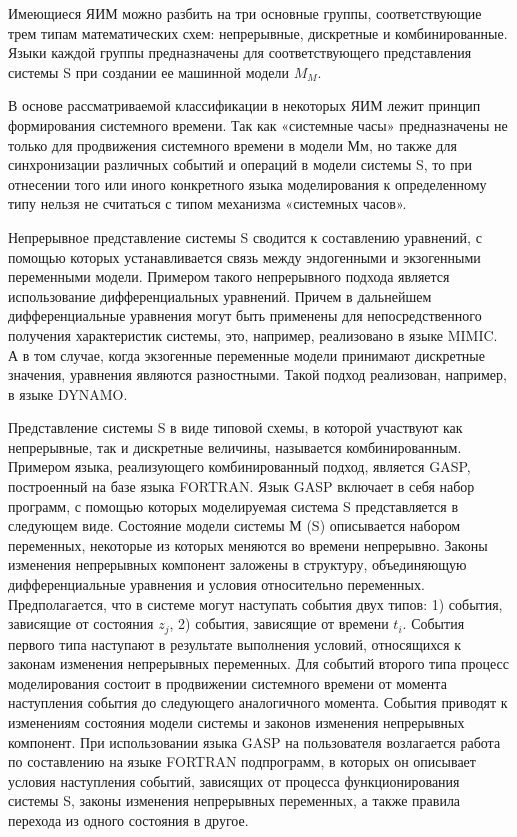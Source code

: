     Имеющиеся ЯИМ можно разбить на три основные группы, соответствующие трем типам математических схем: непрерывные, дискретные и комбинированные. Языки каждой группы предназначены для соответствующего представления системы S при создании ее машинной модели $M_{M}$.

    В основе рассматриваемой классификации в некоторых ЯИМ лежит принцип формирования системного времени. Так как «системные часы» предназначены не только для продвижения системного времени в модели Мм, но также для синхронизации различных событий и операций в модели системы S, то при отнесении того или иного конкретного языка моделирования к определенному типу нельзя не считаться с типом механизма «системных часов».

    Непрерывное представление системы S сводится к составлению уравнений, с помощью которых устанавливается связь между эндогенными и экзогенными переменными модели. Примером такого непрерывного подхода является использование дифференциальных уравнений. Причем в дальнейшем дифференциальные уравнения могут быть применены для непосредственного получения характеристик системы, это, например, реализовано в языке MIMIC. А в том случае, когда экзогенные переменные модели принимают дискретные значения, уравнения являются разностными. Такой подход реализован, например, в языке DYNAMO.

    Представление системы S в виде типовой схемы, в которой участвуют как непрерывные, так и дискретные величины, называется комбинированным. Примером языка, реализующего комбинированный подход, является GASP, построенный на базе языка FORTRAN. Язык GASP включает в себя набор программ, с помощью которых моделируемая система S представляется в следующем виде. Состояние модели системы М (S) описывается набором переменных, некоторые из которых меняются во времени непрерывно. Законы изменения непрерывных компонент заложены в структуру, объединяющую дифференциальные уравнения и условия относительно переменных. Предполагается, что в системе могут наступать события двух типов: 1) события, зависящие от состояния $z_{j}$, 2) события, зависящие от времени $t_{i}$. События первого типа наступают в результате выполнения условий, относящихся к законам изменения непрерывных переменных. Для событий второго типа процесс моделирования состоит в продвижении системного времени от момента наступления события до следующего аналогичного момента. События приводят к изменениям состояния модели системы и законов изменения непрерывных компонент. При использовании языка GASP на пользователя возлагается работа по составлению на языке FORTRAN подпрограмм, в которых он описывает условия наступления событий, зависящих от процесса функционирования системы S, законы изменения непрерывных переменных, а также правила перехода из одного состояния в другое.

